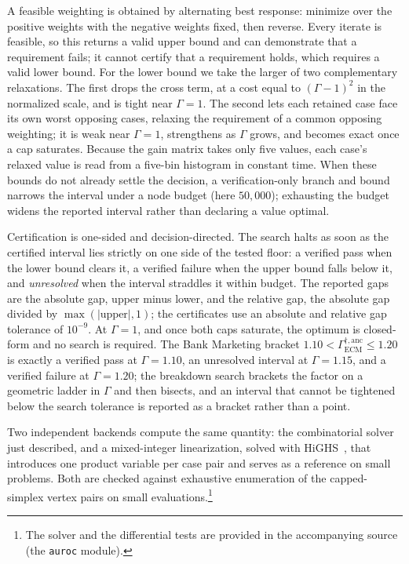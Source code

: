 \documentclass[11pt]{article}
\theoremstyle{remark}
\begin{document}
A feasible weighting is obtained by alternating best response: minimize over the
positive weights with the negative weights fixed, then reverse. Every iterate is
feasible, so this returns a valid upper bound and can demonstrate that a
requirement fails; it cannot certify that a requirement holds, which requires a
valid lower bound. For the lower bound we take the larger of two complementary
relaxations. The first drops the cross term, at a cost equal to $(\Gamma-1)^2$ in
the normalized scale, and is tight near $\Gamma=1$. The second lets each
retained case face its own worst opposing cases, relaxing the requirement of a
common opposing weighting; it is weak near $\Gamma=1$, strengthens as $\Gamma$
grows, and becomes exact once a cap saturates. Because the gain matrix takes
only five values, each case's relaxed value is read from a five-bin histogram in
constant time. When these bounds do not already settle the decision, a
verification-only branch and bound narrows the interval under a node budget
(here $50{,}000$); exhausting the budget widens the reported interval rather than
declaring a value optimal.

Certification is one-sided and decision-directed. The search halts as soon as
the certified interval lies strictly on one side of the tested floor: a verified
pass when the lower bound clears it, a verified failure when the upper bound
falls below it, and \emph{unresolved} when the interval straddles it within
budget. The reported gaps are the absolute gap, upper minus lower, and the
relative gap, the absolute gap divided by $\max(|\text{upper}|,1)$; the
certificates use an absolute and relative gap tolerance of $10^{-9}$. At
$\Gamma=1$, and once both caps saturate, the optimum is closed-form and no
search is required. The Bank Marketing bracket
$1.10<\Gamma_{\mathrm{ECM}}^{\dagger,\mathrm{anc}}\leq1.20$ is exactly a verified
pass at $\Gamma=1.10$, an unresolved interval at $\Gamma=1.15$, and a verified
failure at $\Gamma=1.20$; the breakdown search brackets the factor on a
geometric ladder in $\Gamma$ and then bisects, and an interval that cannot be
tightened below the search tolerance is reported as a bracket rather than a
point.

Two independent backends compute the same quantity: the combinatorial solver
just described, and a mixed-integer linearization, solved with HiGHS~\cite{huangfu2018highs},
that introduces one product variable per case pair and serves as a reference on
small problems. Both are checked against exhaustive enumeration of
the capped-simplex vertex pairs on small evaluations.\footnote{The solver and
the differential tests are provided in the accompanying source (the
\texttt{auroc} module).}
\end{document}
